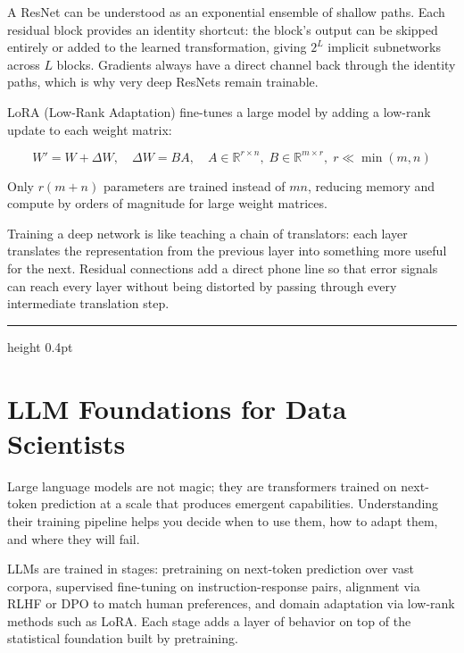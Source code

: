 \documentclass[12pt,a4paper]{article}
\begin{document}
\begin{analogy}
A ResNet can be understood as an exponential ensemble of shallow paths.
Each residual block provides an identity shortcut: the block's output
can be skipped entirely or added to the learned transformation, giving
$2^L$ implicit subnetworks across $L$ blocks. Gradients always have a
direct channel back through the identity paths, which is why very deep
ResNets remain trainable.
\end{analogy}

LoRA (Low-Rank Adaptation) fine-tunes a large model by adding a low-rank
update to each weight matrix:

\begin{equation*}
  W' = W + \Delta W,
  \quad
  \Delta W = B A,
  \quad
  A \in \mathbb{R}^{r \times n},\;
  B \in \mathbb{R}^{m \times r},\;
  r \ll \min(m,n)
\end{equation*}

Only $r(m+n)$ parameters are trained instead of $mn$, reducing memory
and compute by orders of magnitude for large weight matrices.

\begin{mentalmodel}
Training a deep network is like teaching a chain of translators: each
layer translates the representation from the previous layer into something
more useful for the next. Residual connections add a direct phone line so
that error signals can reach every layer without being distorted by
passing through every intermediate translation step.
\end{mentalmodel}

\vspace{10pt}\hrule height 0.4pt\vspace{14pt}

\section*{LLM Foundations for Data Scientists}

Large language models are not magic; they are transformers trained on
next-token prediction at a scale that produces emergent capabilities.
Understanding their training pipeline helps you decide when to use them,
how to adapt them, and where they will fail.

\begin{concept}
LLMs are trained in stages: pretraining on next-token prediction over vast
corpora, supervised fine-tuning on instruction-response pairs, alignment
via RLHF or DPO to match human preferences, and domain adaptation via
low-rank methods such as LoRA. Each stage adds a layer of behavior on top
of the statistical foundation built by pretraining.
\end{concept}
\end{document}
